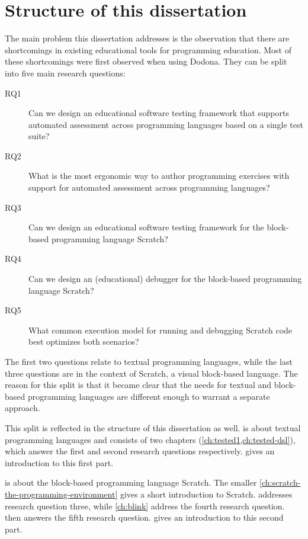\documentclass[../main]{subfiles}
\begin{document}
\section{Structure of this dissertation}\label{sec:a-note-on-the-structure-of-this-thesis}

The main problem this dissertation addresses is the observation that there are shortcomings in existing educational tools for programming education.
Most of these shortcomings were first observed when using Dodona.
They can be split into five main research questions:

\begin{description}
    \item[RQ1] Can we design an educational software testing framework that supports automated assessment across programming languages based on a single test suite?
    \item[RQ2] What is the most ergonomic way to author programming exercises with support for automated assessment across programming languages?
    \item[RQ3] Can we design an educational software testing framework for the block-based programming language Scratch?
    \item[RQ4] Can we design an (educational) debugger for the block-based programming language Scratch?
    \item[RQ5] What common execution model for running and debugging Scratch code best optimizes both scenarios?
\end{description}

The first two questions relate to textual programming languages, while the last three questions are in the context of Scratch, a visual block-based language.
The reason for this split is that it became clear that the needs for textual and block-based programming languages are different enough to warrant a separate approach.

This split is reflected in the structure of this dissertation as well.
 is about textual programming languages and consists of two chapters (\cref{ch:tested1,ch:tested-dsl}), which answer the first and second research questions respectively.
 gives an introduction to this first part.

 is about the block-based programming language Scratch.
The smaller \cref{ch:scratch-the-programming-environment} gives a short introduction to Scratch.
 addresses research question three, while \cref{ch:blink} address the fourth research question.
 then answers the fifth research question.
 gives an introduction to this second part.
\end{document}
